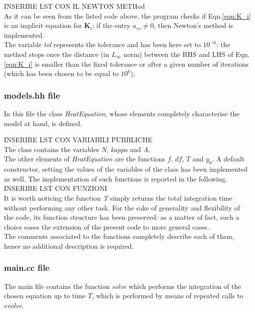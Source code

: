 \documentclass[11pt]{article}
\theoremstyle{theorem}
\theoremstyle{definition}
\begin{document}
INSERIRE LST CON IL NEWTON METHod\\

As it can be seen from the listed code above, the program checks if Eqn.\eqref{eqn:K_i} is an implicit equation for $\mathbf{K}_i$: if the entry $a_{ss}\neq 0$, then Newton's method is implemented.\\
The variable \emph{tol} represents the tolerance and has been here set to $10^{-6}$: the method stops once the distance (in $L_\infty$ norm) between the RHS and LHS of Eqn.\eqref{eqn:K_i} is smaller than the fixed tolerance or after a given number of iterations (which has been chosen to be equal to $10^6$).\\

\subsubsection{models.hh file}
\label{subsubsec:models}
In this file the class \emph{HeatEquation}, whose elements completely characterise the model at hand, is defined.

INSERIRE LST CON VARIABILI PUBBLICHE \\

The class contains the variables \emph{N}, \emph{kappa} and \emph{A}.\\
The other elements of \emph{HeatEquation} are the functions $f$, $df$, $T$ and $y_0$. A default constructor, setting the values of the variables of the class has been implemented as well. The implementation of such functions is reported in the following.\\

INSERIRE LST CON FUNZIONI\\

It is worth noticing the function \emph{T} simply returns the total integration time without performing any other task. For the sake of generality and flexibility of the code, its function structure has been preserved: as a matter of fact, such a choice eases the extension of the present code to more general cases.\\
The comments associated to the functions completely describe each of them, hence no additional description is required.\\

\subsubsection{main.cc file}
The main file contains the function \emph{solve} which performs the integration of the chosen equation up to time $T$, which is performed by means of repeated calls to \emph{evolve}.\\
\end{document}
